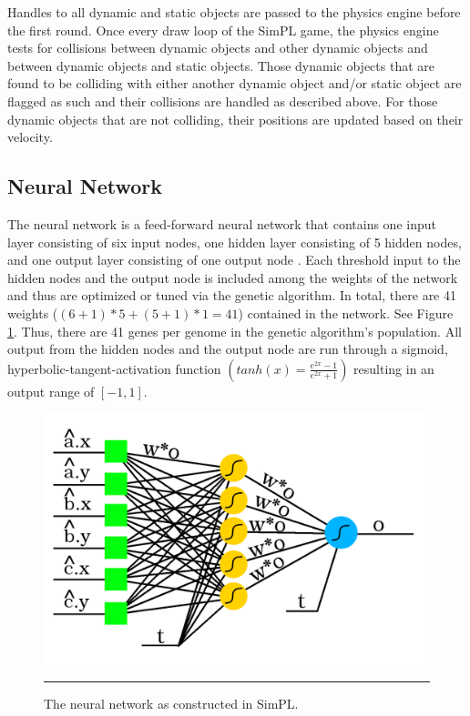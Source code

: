 Handles to all dynamic and static objects are passed to the physics engine before the first round. Once every draw loop of the SimPL game, the physics engine tests for collisions between dynamic objects and other dynamic objects and between dynamic objects and static objects. Those dynamic objects that are found to be colliding with either another dynamic object and/or static object are flagged as such and their collisions are handled as described above. For those dynamic objects that are not colliding, their positions are updated based on their velocity.

\subsection{Neural Network}

The neural network is a feed-forward neural network that contains one input layer consisting of six input nodes, one hidden layer consisting of 5 hidden nodes, and one output layer consisting of one output node \cite{neuralnetworks}. Each threshold input to the hidden nodes and the output node is included among the weights of the network and thus are optimized or tuned via the genetic algorithm. In total, there are 41 weights ($(6+1)*5+(5+1)*1=41$) contained in the network. See Figure \ref{fig:nn}. Thus, there are 41 genes per genome in the genetic algorithm's population. All output from the hidden nodes and the output node are run through a sigmoid, hyperbolic-tangent-activation function $\left ( tanh(x)=\frac{e^{2x}-1}{e^{2x}+1} \right )$ resulting in an output range of $[-1,1]$.

\begin{figure}[htbp]  
  \centering
  \includegraphics[scale=0.34]{../Figures/Chapter3/nn.png}
  \rule{35em}{0.5pt}
  \caption[SimPL NN]{The neural network as constructed in SimPL.}
  \label{fig:nn}
\end{figure}


